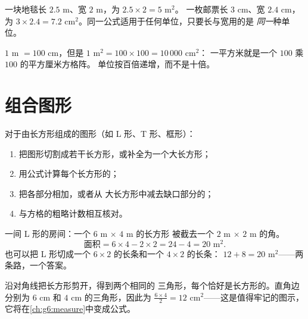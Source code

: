 \begin{example}\label{ex:g5:areas:rectangle}
一块地毯长 $2.5$ m、宽 $2$ m，为 $2.5 \times 2 = 5$ m$^2$。
一枚邮票长 $3$ cm、宽 $2.4$ cm，为 $3 \times 2.4 = 7.2$
cm$^2$。同一公式适用于任何单位，只要长与宽用的是
\emph{同一}种单位。
\end{example}

\begin{example}[平方单位按 100 换算]\label{ex:g5:areas:units}
$1$ m $= 100$ cm，但是 $1$ m$^2 = 100 \times 100 = 10\,000$ cm$^2$：
一平方米就是一个 $100$ 乘 $100$ 的平方厘米方格阵。
单位按百倍递增，而不是十倍。
\end{example}

\section{组合图形}

\begin{method}[切割、相加、相减]\label{met:g5:areas:composite}
对于由长方形组成的图形（如 L 形、T 形、框形）：
\begin{enumerate}
  \item 把图形切割成若干长方形，或补全为一个大长方形；
  \item 用公式计算每个长方形的；
  \item 把各部分相加，或者从
        大长方形中减去缺口部分的；
  \item 与方格的粗略计数相互核对。
\end{enumerate}
\end{method}

\begin{example}\label{ex:g5:areas:composite}
一间 L 形的房间：一个 $6$ m $\times$ $4$ m 的长方形
被截去一个 $2$ m $\times$ $2$ m 的角。
\[
\text{面积} = 6 \times 4 - 2 \times 2 = 24 - 4 = 20 \text{ m}^2 .
\]
也可以把 L 形切成一个 $6 \times 2$ 的长条和一个 $4 \times 2$ 的长条：
$12 + 8 = 20$ m$^2$——两条路，一个答案。
\end{example}

\begin{example}[长方形的一半]\label{ex:g5:areas:halfrect}
沿对角线把长方形剪开，得到两个相同的
三角形，每个恰好是长方形的\emph{}。直角边分别为
$6$ cm 和 $4$ cm 的三角形，因此为 $\frac{6 \times 4}{2} = 12$
cm$^2$——这是值得牢记的图示，
它将在\cref{ch:g6:measure}中变成公式。
\end{example}

